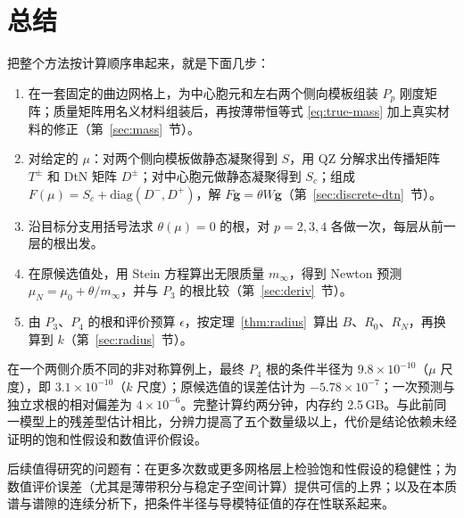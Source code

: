 \documentclass[11pt,a4paper,fontset=fandol]{ctexart}
\begin{document}
\section{总结}
\label{sec:summary}

把整个方法按计算顺序串起来，就是下面几步：
\begin{enumerate}
\item 在一套固定的曲边网格上，为中心胞元和左右两个侧向模板组装 $P_p$ 刚度矩阵；质量矩阵用名义材料组装后，再按薄带恒等式 \eqref{eq:true-mass} 加上真实材料的修正（第~\ref{sec:mass}~节）。
\item 对给定的 $\mu$：对两个侧向模板做静态凝聚得到 $S$，用 QZ 分解求出传播矩阵 $T^\pm$ 和 DtN 矩阵 $D^\pm$；对中心胞元做静态凝聚得到 $S_c$；组成 $F(\mu)=S_c+\mathrm{diag}(D^-,D^+)$，解 $F\bm g=\theta W\bm g$（第~\ref{sec:discrete-dtn}~节）。
\item 沿目标分支用括号法求 $\theta(\mu)=0$ 的根，对 $p=2,3,4$ 各做一次，每层从前一层的根出发。
\item 在原候选值处，用 Stein 方程算出无限质量 $m_\infty$，得到 Newton 预测 $\mu_N=\mu_0+\theta/m_\infty$，并与 $P_3$ 的根比较（第~\ref{sec:deriv}~节）。
\item 由 $P_3$、$P_4$ 的根和评价预算 $\epsilon$，按定理~\ref{thm:radius}~算出 $B$、$R_0$、$R_N$，再换算到 $k$（第~\ref{sec:radius}~节）。
\end{enumerate}

在一个两侧介质不同的非对称算例上，最终 $P_4$ 根的条件半径为 $9.8\times10^{-10}$（$\mu$ 尺度），即 $3.1\times10^{-10}$（$k$ 尺度）；原候选值的误差估计为 $-5.78\times10^{-7}$；一次预测与独立求根的相对偏差为 $4\times10^{-6}$。完整计算约两分钟，内存约 2.5\,GB。与此前同一模型上的残差型估计相比，分辨力提高了五个数量级以上，代价是结论依赖未经证明的饱和性假设和数值评价假设。

后续值得研究的问题有：在更多次数或更多网格层上检验饱和性假设的稳健性；为数值评价误差（尤其是薄带积分与稳定子空间计算）提供可信的上界；以及在本质谱与谱隙的连续分析下，把条件半径与导模特征值的存在性联系起来\citep{Klindworth2015,CancesDussonMadayStammVohralik2020}。



\end{document}
